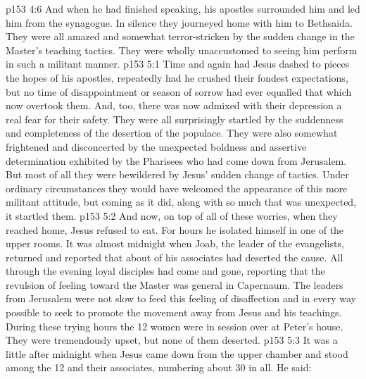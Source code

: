 \vs p153 4:6 And when he had finished speaking, his apostles surrounded him and led him from the synagogue. In silence they journeyed home with him to Bethsaida. They were all amazed and somewhat terror\hyp{}stricken by the sudden change in the Master’s teaching tactics. They were wholly unaccustomed to seeing him perform in such a militant manner.
\vs p153 5:1 Time and again had Jesus dashed to pieces the hopes of his apostles, repeatedly had he crushed their fondest expectations, but no time of disappointment or season of sorrow had ever equalled that which now overtook them. And, too, there was now admixed with their depression a real fear for their safety. They were all surprisingly startled by the suddenness and completeness of the desertion of the populace. They were also somewhat frightened and disconcerted by the unexpected boldness and assertive determination exhibited by the Pharisees who had come down from Jerusalem. But most of all they were bewildered by Jesus’ sudden change of tactics. Under ordinary circumstances they would have welcomed the appearance of this more militant attitude, but coming as it did, along with so much that was unexpected, it startled them.
\vs p153 5:2 And now, on top of all of these worries, when they reached home, Jesus refused to eat. For hours he isolated himself in one of the upper rooms. It was almost midnight when Joab, the leader of the evangelists, returned and reported that about  of his associates had deserted the cause. All through the evening loyal disciples had come and gone, reporting that the revulsion of feeling toward the Master was general in Capernaum. The leaders from Jerusalem were not slow to feed this feeling of disaffection and in every way possible to seek to promote the movement away from Jesus and his teachings. During these trying hours the 12 women were in session over at Peter’s house. They were tremendously upset, but none of them deserted.
\vs p153 5:3 It was a little after midnight when Jesus came down from the upper chamber and stood among the 12 and their associates, numbering about 30 in all. He said: 
